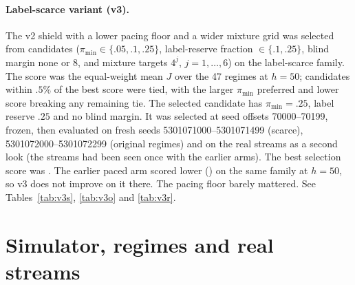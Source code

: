 \documentclass[10pt]{article}
\theoremstyle{plain}
\theoremstyle{definition}
\begin{document}
\paragraph{Label-scarce variant (v3).}\label{app:v3}
The v2 shield with a lower pacing floor and a wider mixture grid was selected from \VThreeNCand{} candidates ($\pi_{\min}\in\{.05,.1,.25\}$, label-reserve fraction $\in\{.1,.25\}$, blind margin none or 8, and mixture targets $4^j$, $j=1,\dots,6$) on the label-scarce family. The score was the equal-weight mean $J$ over the 47 regimes at $h=50$; candidates within $.5\%$ of the best score were tied, with the larger $\pi_{\min}$ preferred and lower score breaking any remaining tie. The selected candidate has $\pi_{\min}=.25$, label reserve $.25$ and no blind margin. It was selected at seed offsets 70000--70199, frozen, then evaluated on fresh seeds 5301071000--5301071499 (scarce), 5301072000--5301072299 (original regimes) and on the real streams as a second look (the streams had been seen once with the earlier arms). The best selection score was \VThreeBest. The earlier paced arm scored lower (\VThreeRefPaced) on the same family at $h=50$, so v3 does not improve on it there. The pacing floor barely mattered. See Tables~\ref{tab:v3s}, \ref{tab:v3o} and \ref{tab:v3r}.
\begin{table}[!htbp]\caption{Label-scarce variant v3, registered \NRegimes{} regimes, fresh seeds.}\label{tab:v3o}\centering\scriptsize\resizebox{\linewidth}{!}{}\end{table}
\begin{table}[!htbp]\caption{Label-scarce variant v3 on the real streams (second look), clean feedback, pooled.}\label{tab:v3r}\centering\scriptsize\end{table}
\begin{table}[!htbp]\caption{Label-scarce variant v3, scarce family (47 regimes), fresh seeds.}\label{tab:v3s}\centering\scriptsize\resizebox{\linewidth}{!}{}\end{table}

\section{Simulator, regimes and real streams}\label{app:sim}
\end{document}
